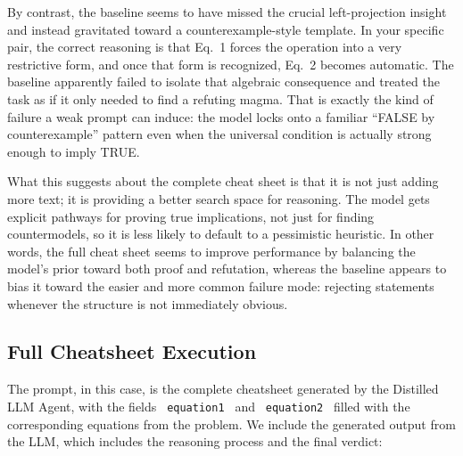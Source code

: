 \documentclass{article}
\begin{document}
By contrast, the baseline seems to have missed the crucial left-projection insight and instead gravitated toward a counterexample-style template. In your specific pair, the correct reasoning is that Eq.~1 forces the operation into a very restrictive form, and once that form is recognized, Eq.~2 becomes automatic. The baseline apparently failed to isolate that algebraic consequence and treated the task as if it only needed to find a refuting magma. That is exactly the kind of failure a weak prompt can induce: the model locks onto a familiar ``FALSE by counterexample'' pattern even when the universal condition is actually strong enough to imply TRUE.

What this suggests about the complete cheat sheet is that it is not just adding more text; it is providing a better search space for reasoning. The model gets explicit pathways for proving true implications, not just for finding countermodels, so it is less likely to default to a pessimistic heuristic. In other words, the full cheat sheet seems to improve performance by balancing the model’s prior toward both proof and refutation, whereas the baseline appears to bias it toward the easier and more common failure mode: rejecting statements whenever the structure is not immediately obvious.

\subsection{Full Cheatsheet Execution}

The prompt, in this case, is the complete cheatsheet generated by the Distilled LLM Agent, with the fields \texttt{{{  equation1  }}} and \texttt{{{ equation2 }}} filled with the corresponding equations from the problem. We include the generated output from the LLM, which includes the reasoning process and the final verdict:
\end{document}
